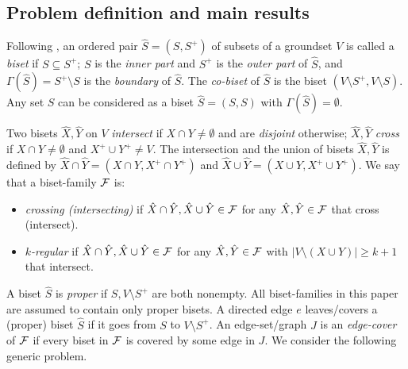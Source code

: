 \subsection{Problem definition and main results}

Following \cite{F-R}, an ordered pair $\hat{S}=(S,S^+)$ of subsets of a groundset $V$ is called a {\em biset} 
if $S \subseteq S^+$; $S$ is the {\em inner part} and $S^+$ is the {\em outer part} of $\hat{S}$,
and $\Gamma(\hat{S})=S^+ \setminus S$ is the {\em boundary} of $\hat{S}$. 
The {\em co-biset} of $\hat{S}$ is the biset $(V \setminus S^+,V \setminus S)$.
Any set $S$ can be considered as a biset $\hat{S}=(S,S)$ with $\Gamma(\hat{S})=\emptyset$. 

\begin{definition} \label{d:1}
Two bisets $\hat{X},\hat{Y}$ on $V$ 
{\em intersect} if $X \cap Y \neq \emptyset$ and are {\em disjoint} otherwise;
$\hat{X},\hat{Y}$ {\em cross} if $X \cap Y \neq \emptyset$ and $X^+ \cup Y^+ \neq V$.
The intersection and the union of bisets $\hat{X},\hat{Y}$ is defined by
$\hat{X} \cap \hat{Y} = (X \cap Y, X^+ \cap Y^+)$ and $\hat{X} \cup \hat{Y} = (X \cup Y,X^+ \cup Y^+)$.
We say that a biset-family ${\cal F}$ is: 
\begin{itemize}
\item
{\em crossing (intersecting)} if $\hat{X} \cap \hat{Y}, \hat{X} \cup \hat{Y} \in {\cal F}$ 
for any $\hat{X},\hat{Y} \in {\cal F}$ that cross (intersect).
\item
{\em $k$-regular} if $\hat{X} \cap \hat{Y}, \hat{X} \cup \hat{Y} \in {\cal F}$ 
for any $\hat{X},\hat{Y} \in {\cal F}$ with $|V \setminus (X \cup Y)| \geq k+1$ that intersect.
\end{itemize}
\end{definition}

A biset $\hat{S}$ is {\em proper} if $S,V \setminus S^+$ are both nonempty.
All biset-families in this paper are assumed to contain only proper bisets.
A directed edge $e$ leaves/covers a (proper) biset $\hat{S}$ if it goes from $S$ to $V \setminus S^+$.
An edge-set/graph $J$ is an {\em edge-cover} of ${\cal F}$ 
if every biset in ${\cal F}$ is covered by some edge in $J$.
We consider the following generic problem.

\vspace{0.1cm}

\begin{center} 
\end{center}


